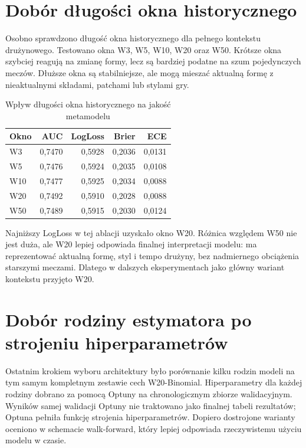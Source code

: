 \section{Dobór długości okna historycznego}

Osobno sprawdzono długość okna historycznego dla pełnego kontekstu drużynowego. Testowano okna W3, W5, W10, W20 oraz W50. Krótsze okna szybciej reagują na zmianę formy, lecz są bardziej podatne na szum pojedynczych meczów. Dłuższe okna są stabilniejsze, ale mogą mieszać aktualną formę z nieaktualnymi składami, patchami lub stylami gry.

\begin{table}[H]
    \centering
    \caption{Wpływ długości okna historycznego na jakość metamodelu}
    \label{tab:metamodel_window_ablation}
    \begin{tabular}{lrrrr}
        \toprule
        Okno & AUC & LogLoss & Brier & ECE \\
        \midrule
        W3 & 0{,}7470 & 0{,}5928 & 0{,}2036 & 0{,}0131 \\
        W5 & 0{,}7476 & 0{,}5924 & 0{,}2035 & 0{,}0108 \\
        W10 & 0{,}7477 & 0{,}5925 & 0{,}2034 & 0{,}0088 \\
        W20 & 0{,}7492 & 0{,}5910 & 0{,}2028 & 0{,}0088 \\
        W50 & 0{,}7489 & 0{,}5915 & 0{,}2030 & 0{,}0124 \\
        \bottomrule
    \end{tabular}
\end{table}

Najniższy LogLoss w tej ablacji uzyskało okno W20. Różnica względem W50 nie jest duża, ale W20 lepiej odpowiada finalnej interpretacji modelu: ma reprezentować aktualną formę, styl i tempo drużyny, bez nadmiernego obciążenia starszymi meczami. Dlatego w dalszych eksperymentach jako główny wariant kontekstu przyjęto W20.

\section{Dobór rodziny estymatora po strojeniu hiperparametrów}

Ostatnim krokiem wyboru architektury było porównanie kilku rodzin modeli na tym samym kompletnym zestawie cech W20-Binomial. Hiperparametry dla każdej rodziny dobrano za pomocą Optuny na chronologicznym zbiorze walidacyjnym. Wyników samej walidacji Optuny nie traktowano jako finalnej tabeli rezultatów; Optuna pełniła funkcję strojenia hiperparametrów. Dopiero dostrojone warianty oceniono w schemacie walk-forward, który lepiej odpowiada rzeczywistemu użyciu modelu w czasie.

